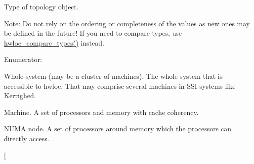 Type of topology object. 

\begin{Desc}
\item[Note:]Do not rely on the ordering or completeness of the values as new ones may be defined in the future! If you need to compare types, use \hyperlink{group__hwlocality__types_g1820ea0dfd8e9dca28f9ea7624df5ae2}{hwloc\_\-compare\_\-types()} instead. \end{Desc}
\begin{Desc}
\item[Enumerator: ]\par
\begin{description}
\item[{\em 
\hypertarget{group__hwlocality__types_ggcd37bb612667dc437d66bfb175a8dc553aa1b842d1fd4207ebce171f95a244ec}{
HWLOC\_\-OBJ\_\-SYSTEM}
\label{group__hwlocality__types_ggcd37bb612667dc437d66bfb175a8dc553aa1b842d1fd4207ebce171f95a244ec}
}]Whole system (may be a cluster of machines). The whole system that is accessible to hwloc. That may comprise several machines in SSI systems like Kerrighed. \item[{\em 
\hypertarget{group__hwlocality__types_ggcd37bb612667dc437d66bfb175a8dc553f4e83ffc4a259354959ae8a9eaa2a80}{
HWLOC\_\-OBJ\_\-MACHINE}
\label{group__hwlocality__types_ggcd37bb612667dc437d66bfb175a8dc553f4e83ffc4a259354959ae8a9eaa2a80}
}]Machine. A set of processors and memory with cache coherency. \item[{\em 
\hypertarget{group__hwlocality__types_ggcd37bb612667dc437d66bfb175a8dc55af0964881117bdedf1a5e9332cd120dd}{
HWLOC\_\-OBJ\_\-NODE}
\label{group__hwlocality__types_ggcd37bb612667dc437d66bfb175a8dc55af0964881117bdedf1a5e9332cd120dd}
}]NUMA node. A set of processors around memory which the processors can directly access. \item[{\em 
}
\end{description}
\end{Desc}
